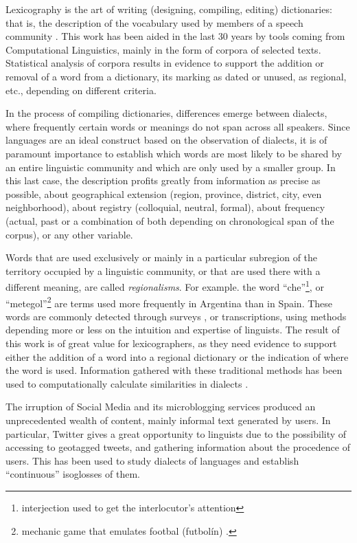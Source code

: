 Lexicography is the art of writing (designing, compiling, editing) dictionaries: that is, the description of the vocabulary used by members of a speech community \cite{atkins2008oxford}. This work has been aided in the last 30 years by tools coming from Computational Linguistics, mainly in the form of corpora of selected texts. Statistical analysis of corpora results in evidence to support the addition or removal of a word from a dictionary, its marking as dated or unused, as regional, etc., depending on different criteria.

In the process of compiling dictionaries, differences emerge between dialects, where frequently certain words or meanings do not span across all speakers.  Since languages are an ideal construct based on the observation of dialects, it is of paramount importance to establish which words are most likely to be shared by an entire linguistic community and which are only used by a smaller group. In this last case, the description profits greatly from information as precise as possible, about geographical extension (region, province, district, city, even neighborhood), about registry (colloquial, neutral, formal), about frequency (actual, past or a combination of both depending on chronological span of the corpus), or any other variable.

Words that are used exclusively or mainly in a particular subregion of the territory occupied by a linguistic community, or that are used there with a different meaning, are called \emph{regionalisms}. For example. the word ``che''\footnote{interjection used to get the interlocutor's attention}, or ``metegol''\footnote{mechanic game that emulates footbal (futbolín) \cite{academia2008diccionario}.} are terms used more frequently in Argentina than in Spain. These words are commonly detected through surveys \cite{almeida1995variacion, labov2005atlas}, or transcriptions, using methods depending more or less on the intuition and expertise of linguists. The result of this work is of great value for lexicographers, as they need evidence to support either the addition of a word into a regional dictionary or the indication of where the word is used. Information gathered with these traditional methods has been used to computationally calculate similarities in dialects \cite{kessler1995computational, nerbonne1996phonetic}. 

The irruption of Social Media and its microblogging services produced an unprecedented wealth of content, mainly informal text generated by users. In particular, Twitter gives a great opportunity to linguists due to the possibility of accessing to geotagged tweets, and gathering information about the procedence of users. This has been used to study dialects of languages\cite{gonccalves2014crowdsourcing,huang2016understanding} and establish ``continuous'' isoglosses of them.

